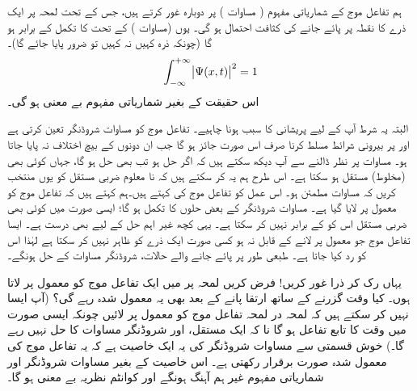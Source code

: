 ہم تفاعل موج کے شماریاتی مفہوم ( مساوات ) پر دوبارہ غور کرتے ہیں، جس کے تحت لمحہ   پر ایک ذرے کا نقطہ  پر پائے جانے کی کثافت احتمال  ہو گی۔  یوں  
(مساوات ) کے تحت  کا تکمل  کے برابر ہو گا (چونکہ ذرہ کہیں نہ کہیں تو ضرور پایا جائے گا)۔ 
\begin{align}\label{مساوات_تفاعل_موج_احتمال_اکائی}
\int_{-\infty}^{+\infty}\abs{\Psi(x,t)}^2 = 1
\end{align}
اس حقیقت کے بغیر شماریاتی مفہوم بے معنی ہو گی۔ 

البتہ یہ شرط آپ کے لیے  پریشانی کا سبب ہونا چاہیے۔   تفاعل موج کو مساوات شروڈنگر تعین کرتی ہے اور  پر بیرونی شرائط مسلط کرنا صرف اس صورت جائز ہو گا جب ان دونوں کے بیچ اختلاف نہ پایا جاتا ہو۔ مساوات  پر نظر ڈالنے سے آپ دیکھ سکتے ہیں کہ اگر   حل ہو تب  بھی حل ہو گا، جہاں  کوئی بھی (مخلوط) مستقل ہو سکتا ہے۔ اس طرح ہم یہ کر سکتے ہیں کہ نا معلوم  ضربی مستقل کو یوں منتخب کریں کہ  مساوات   مطمئن ہو۔  اس عمل کو تفاعل موج کی  کہتے ہیں۔ہم کہتے ہیں کہ تفاعل موج کو معمول پر لایا گیا ہے۔ مساوات شروڈنگر کے بعض حلوں کا تکمل  ہو گا؛ ایسی صورت میں کوئی  بھی ضربی مستقل اس کو  کے برابر نہیں کر سکتا ہے۔ یہی کچھ غیر اہم حل  کے لیے بھی درست ہے۔ ایسا تفاعل موج جو معمول پر لانے کے قابل نہ ہو  کسی صورت ایک ذرے کو ظاہر نہیں کر سکتا ہے لہٰذا اس کو رد کیا جاتا ہے۔  طبعی طور پر پائے جانے والے حالات، شروڈنگر مساوات کے    حل ہونگے۔

 یہاں رک کر ذرا غور کریں!  فرض کریں لمحہ  پر میں ایک تفاعل موج کو معمول پر لاتا ہوں۔ کیا وقت گزرنے کے ساتھ  ارتقا پانے کے بعد بھی یہ معمول شدہ رہے گی؟ (آپ ایسا نہیں کر سکتے ہیں  کہ لمحہ در لمحہ  تفاعل موج کو معمول پر لائیں چونکہ ایسی صورت میں  وقت  کا تابع تفاعل ہو گا نا کہ ایک مستقل، اور  شروڈنگر مساوات کا حل نہیں رہے گا۔) خوش قسمتی سے مساوات شروڈنگر کی یہ ایک خاصیت ہے کہ یہ تفاعل موج  کی معمول شدہ صورت برقرار رکھتی ہے۔ اس خاصیت کے بغیر مساوات شروڈنگر  اور شماریاتی مفہوم غیر ہم آہنگ ہونگے اور  کوانٹم نظریہ بے معنی ہو گا۔

